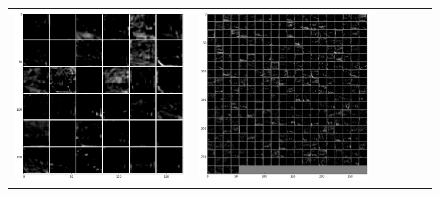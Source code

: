 \begin{figure}[!htb]
\begin{center}
\begin{tabular}{|c|c|c|c|c|c|}
\includegraphics[scale=0.1]{sunny2_conv2_fm.png} &
\includegraphics[scale=0.1]{sunny2_conv3_fm.png} &

\end{tabular}
\end{center}
\end{figure}
